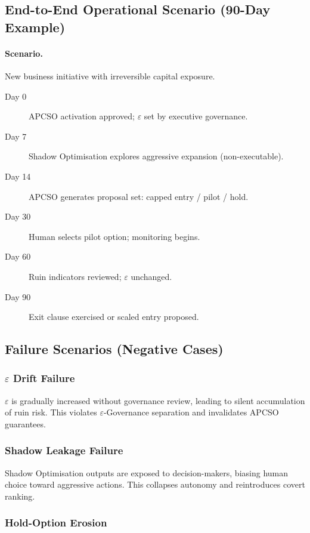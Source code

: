 \subsection{End-to-End Operational Scenario (90-Day Example)}

\paragraph{Scenario.}
New business initiative with irreversible capital exposure.

\begin{description}
\item[Day 0] APCSO activation approved; $\varepsilon$ set by
executive governance.
\item[Day 7] Shadow Optimisation explores aggressive expansion
(non-executable).
\item[Day 14] APCSO generates proposal set: capped entry / pilot /
hold.
\item[Day 30] Human selects pilot option; monitoring begins.
\item[Day 60] Ruin indicators reviewed; $\varepsilon$ unchanged.
\item[Day 90] Exit clause exercised or scaled entry proposed.
\end{description}

\subsection{Failure Scenarios (Negative Cases)}

\subsubsection{$\varepsilon$ Drift Failure}

$\varepsilon$ is gradually increased without governance review,
leading to silent accumulation of ruin risk. This violates
$\varepsilon$-Governance separation and invalidates APCSO
guarantees.

\subsubsection{Shadow Leakage Failure}

Shadow Optimisation outputs are exposed to decision-makers, biasing
human choice toward aggressive actions. This collapses autonomy and
reintroduces covert ranking.

\subsubsection{Hold-Option Erosion}


